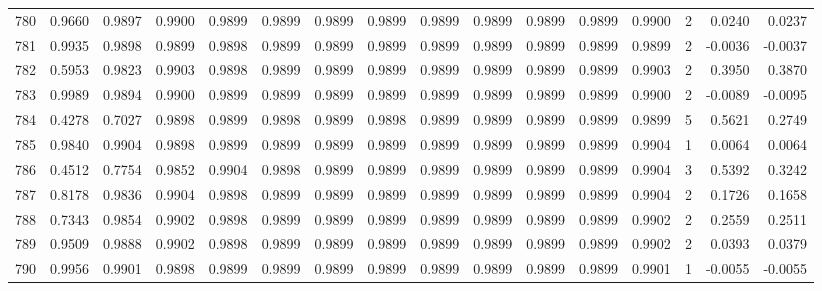 \begin{tabular}{lrrrrrrrrrrrrrrr}
780 &      0.9660 &  0.9897 &  0.9900 &  0.9899 &  0.9899 &  0.9899 &  0.9899 &  0.9899 &  0.9899 &  0.9899 &   0.9899 &     0.9900 &      2 &                    0.0240 &                     0.0237 \\
781 &      0.9935 &  0.9898 &  0.9899 &  0.9898 &  0.9899 &  0.9899 &  0.9899 &  0.9899 &  0.9899 &  0.9899 &   0.9899 &     0.9899 &      2 &                   -0.0036 &                    -0.0037 \\
782 &      0.5953 &  0.9823 &  0.9903 &  0.9898 &  0.9899 &  0.9899 &  0.9899 &  0.9899 &  0.9899 &  0.9899 &   0.9899 &     0.9903 &      2 &                    0.3950 &                     0.3870 \\
783 &      0.9989 &  0.9894 &  0.9900 &  0.9899 &  0.9899 &  0.9899 &  0.9899 &  0.9899 &  0.9899 &  0.9899 &   0.9899 &     0.9900 &      2 &                   -0.0089 &                    -0.0095 \\
784 &      0.4278 &  0.7027 &  0.9898 &  0.9899 &  0.9898 &  0.9899 &  0.9898 &  0.9899 &  0.9899 &  0.9899 &   0.9899 &     0.9899 &      5 &                    0.5621 &                     0.2749 \\
785 &      0.9840 &  0.9904 &  0.9898 &  0.9899 &  0.9899 &  0.9899 &  0.9899 &  0.9899 &  0.9899 &  0.9899 &   0.9899 &     0.9904 &      1 &                    0.0064 &                     0.0064 \\
786 &      0.4512 &  0.7754 &  0.9852 &  0.9904 &  0.9898 &  0.9899 &  0.9899 &  0.9899 &  0.9899 &  0.9899 &   0.9899 &     0.9904 &      3 &                    0.5392 &                     0.3242 \\
787 &      0.8178 &  0.9836 &  0.9904 &  0.9898 &  0.9899 &  0.9899 &  0.9899 &  0.9899 &  0.9899 &  0.9899 &   0.9899 &     0.9904 &      2 &                    0.1726 &                     0.1658 \\
788 &      0.7343 &  0.9854 &  0.9902 &  0.9898 &  0.9899 &  0.9899 &  0.9899 &  0.9899 &  0.9899 &  0.9899 &   0.9899 &     0.9902 &      2 &                    0.2559 &                     0.2511 \\
789 &      0.9509 &  0.9888 &  0.9902 &  0.9898 &  0.9899 &  0.9899 &  0.9899 &  0.9899 &  0.9899 &  0.9899 &   0.9899 &     0.9902 &      2 &                    0.0393 &                     0.0379 \\
790 &      0.9956 &  0.9901 &  0.9898 &  0.9899 &  0.9899 &  0.9899 &  0.9899 &  0.9899 &  0.9899 &  0.9899 &   0.9899 &     0.9901 &      1 &                   -0.0055 &                    -0.0055 \\

\end{tabular}
